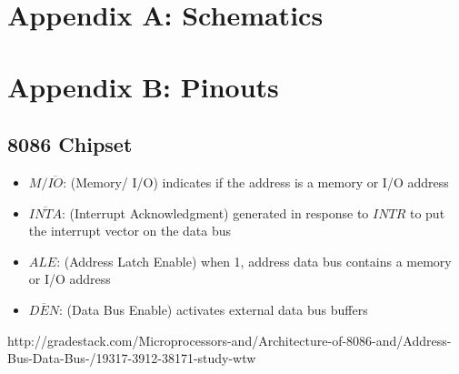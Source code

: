 \newpage
\appendix
{}

    \section{Appendix A: Schematics}

    \section{Appendix B: Pinouts}

        \label{appendix:pinouts}

        \subsection{8086 Chipset}

                \begin{itemize}

                    \item $M/\overline{IO}$: (Memory/ I/O) indicates if the address is a memory or I/O address

                    \item $\overline{INTA}$: (Interrupt Acknowledgment) generated in response to $INTR$ to put the interrupt vector on the data bus

                    \item $ALE$: (Address Latch Enable) when 1, address data bus contains a memory or I/O address

                    \item $\overline{DEN}$: (Data Bus Enable) activates external data bus buffers

                \end{itemize}


    \begin{thebibliography}{9}

    http://gradestack.com/Microprocessors-and/Architecture-of-8086-and/Address-Bus-Data-Bus-/19317-3912-38171-study-wtw

    \end{thebibliography}